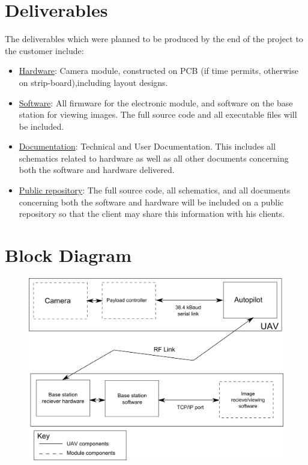 \section{Deliverables}
The deliverables which were planned to be produced by the end of the project to the customer include:
\begin{itemize}
	\item \underline{Hardware}: Camera module, constructed on PCB (if time permits, otherwise on strip-board),including layout designs.
	\item \underline{Software}: All firmware for the electronic module, and software on the base station for viewing images. The full source code and all executable files will be included.
	\item \underline{Documentation}: Technical and User Documentation. This includes all schematics related to hardware as well as all other documents concerning both the software and hardware delivered.
	\item \underline{Public repository}: The full source code, all schematics, and all documents concerning both the software and hardware will be included on a public repository so that the client may share this information with his clients.
\end{itemize}

\section{Block Diagram}

\begin{figure}[H]
        \centering
        \includegraphics[width=1.00\textwidth]{figures/spec_block_diagram_2.png}
        \label{fig:block1}
\end{figure}

